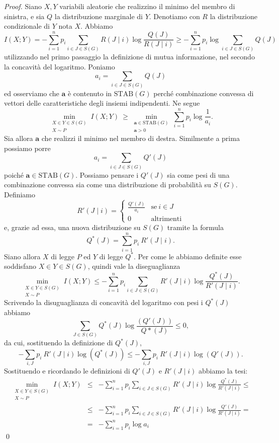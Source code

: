 \begin{proof}
	Siano \(X,Y\) variabili aleatorie che realizzino il minimo del membro di sinistra, e sia \(Q\) la distribuzione marginale di \(Y\). Denotiamo con \(R\) la distribuzione condizionale di \(Y\) nota \(X\). Abbiamo
	\[I(X;Y)=-\sum_{i=1}^n p_i\sum_{i\in J\in S(G)} R(J\mid i)\log{\frac{Q(J)}{R(J\mid i)}}\ge -\sum_{i=1}^n p_i \log{\sum_{i\in J\in S(G)}} Q(J)\]
	utilizzando nel primo passaggio la definizione di mutua informazione, nel secondo la concavità del logaritmo. Poniamo
	\[a_i=\sum_{i\in J\in S(G)} Q(J)\]
	ed osserviamo che \(\mathbf{a}\) è contenuto in \(\text{STAB}(G)\) perché combinazione convessa di vettori delle caratteristiche degli insiemi indipendenti. Ne segue
	\[\min_{\substack{X\in Y\in S(G) \\
	X\sim P}} I(X;Y)\ \ge \min_{\substack{\mathbf{a}\in \text{STAB}(G) \\
	\mathbf{a}>0}} \sum_{i=1}^n p_i\log{\frac{1}{a_i}}.\]
	Sia allora \(\mathbf{a}\) che realizzi il minimo nel membro di destra. Similmente a prima possiamo porre
	\[a_i=\sum_{i\in J\in S(G)} Q'(J)\]
	poiché \(\mathbf{a}\in \text{STAB}(G)\). Possiamo pensare i \(Q'(J)\) sia come pesi di una combinazione convessa sia come una distribuzione di probabilità su \(S(G)\). Definiamo
	\[R'(J\mid i)= 
	\begin{cases}
		\frac{Q'(J)}{a_i} & \text{se}\ i\in J\\
		0 & \text{altrimenti} 
	\end{cases}
	\]
	e, grazie ad essa, una nuova distribuzione su \(S(G)\) tramite la formula
	\[Q^*(J)=\sum_{i=1}^n p_i\ R'(J\mid i).\]
	Siano allora \(X\) di legge \(P\) ed \(Y\) di legge \(Q^*\). Per come le abbiamo definite esse soddisfano \(X\in Y\in S(G)\), quindi vale la diseguaglianza
	\[\min_{\substack{X\in Y\in S(G) \\
	X\sim P}} I(X;Y)\le -\sum_{i=1}^n p_i\sum_{i\in J\in S(G)} R'(J\mid i)\log{\frac{Q^*(J)}{R'(J\mid i)}}.\]
	Scrivendo la disuguaglianza di concavità del logaritmo con pesi i \(Q^*(J)\) abbiamo
	\[\sum_{J\in S(G)} Q^*(J)\log{\frac{(Q'(J))}{Q*(J)}} \le 0,\]
	da cui, sostituendo la definizione di \(Q^*(J)\),
	\[-\sum_{i,J} p_i\ R'(J\mid i)\log(Q^*(J))\le -\sum_{i,J} p_i\ R'(J\mid i)\log(Q'(J)).\]
	Sostituendo e ricordando le definizioni di \(Q'(J)\) e \(R'(J\mid i)\) abbiamo la tesi: 
	\begin{eqnarray}
		\min_{\substack{X\in Y\in S(G) \\
		X\sim P}} I(X;Y)&\le& -\sum_{i=1}^n p_i\sum_{i\in J\in S(G)} R'(J\mid i)\log{\frac{Q^*(J)}{R'(J\mid i)}}\le \nonumber \\
		&\le& -\sum_{i=1}^n p_i\sum_{i\in J\in S(G)} R'(J\mid i)\log{\frac{Q'(J)}{R'(J\mid i)}}= \nonumber \\
		&=& -\sum_{i=1}^n p_i\log{a_i} \nonumber 
	\end{eqnarray}
	\qed 
\end{proof}